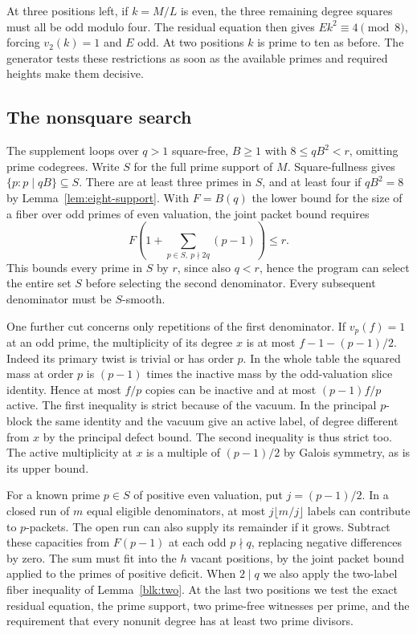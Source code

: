 \documentclass[11pt]{amsart}
\numberwithin{equation}{section}
\begin{document}
At three positions left, if $k=M/L$ is even, the three remaining
degree squares must all be odd modulo four. The residual equation
then gives $Ek^2\equiv4\pmod8$, forcing $v_2(k)=1$ and $E$ odd.
At two positions $k$ is prime to ten as before. The generator tests
these restrictions as soon as the available primes and required
heights make them decisive.

\subsection{The nonsquare search}
The supplement loops over $q>1$ square-free, $B\ge1$ with $8\le qB^2<r$, omitting prime codegrees. Write $S$ for the full prime support of $M$. Square-fullness gives $\{p:p\mid qB\}\subseteq S$. There are at least three primes in $S$, and at least four if $qB^2=8$ by Lemma~\ref{lem:eight-support}. With $F=B(q)$ the lower bound for the size of a fiber over odd primes of even valuation, the joint packet bound requires
\[
 F\left(1+\sum_{p\in S,\ p\nmid2q}(p-1)\right)\le r.
\]
This bounds every prime in $S$ by $r$, since also $q<r$, hence the program can select the entire set $S$ before selecting the second denominator. Every subsequent denominator must be $S$-smooth.

One further cut concerns only repetitions of the first denominator. If $v_p(f)=1$ at an odd prime, the multiplicity of its degree $x$ is at most $f-1-(p-1)/2$. Indeed its primary twist is trivial or has order $p$. In the whole table the squared mass at order $p$ is $(p-1)$ times the inactive mass by the odd-valuation slice identity. Hence at most $f/p$ copies can be inactive and at most $(p-1)f/p$ active. The first inequality is strict because of the vacuum. In the principal $p$-block the same identity and the vacuum give an active label, of degree different from $x$ by the principal defect bound. The second inequality is thus strict too. The active multiplicity at $x$ is a multiple of $(p-1)/2$ by Galois symmetry, as is its upper bound.

For a known prime $p\in S$ of positive even valuation, put $j=(p-1)/2$. In a closed run of $m$ equal eligible denominators, at most $j\lfloor m/j\rfloor$ labels can contribute to $p$-packets. The open run can also supply its remainder if it grows. Subtract these capacities from $F(p-1)$ at each odd $p\nmid q$, replacing negative differences by zero. The sum must fit into the $h$ vacant positions, by the joint packet bound applied to the primes of positive deficit. When $2\mid q$ we also apply the two-label fiber inequality of Lemma~\ref{blk:two}. At the last two positions we test the exact residual equation, the prime support, two prime-free witnesses per prime, and the requirement that every nonunit degree has at least two prime divisors.
\end{document}
